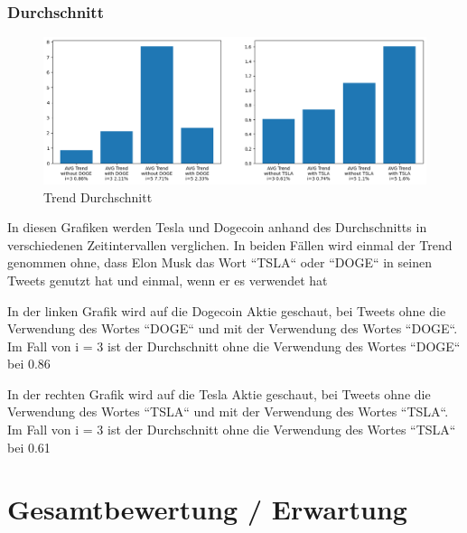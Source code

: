 \documentclass{article}
\begin{document}
\subsubsection{Durchschnitt}
\begin{figure}[!htb]
  	\includegraphics[width=\textwidth, center]{../imgs/Trend_Durchschnitt.png}
 	\caption{Trend Durchschnitt}
 	\label{fig:Trend Durchschnitt}
\end{figure}
In diesen Grafiken werden Tesla und Dogecoin anhand des Durchschnitts in verschiedenen Zeitintervallen verglichen. In beiden Fällen wird einmal der Trend genommen ohne, dass Elon Musk das Wort “TSLA“ oder “DOGE“ in seinen Tweets genutzt hat und einmal, wenn er es verwendet hat

In der linken Grafik wird auf die Dogecoin Aktie geschaut, bei Tweets ohne die Verwendung des Wortes “DOGE“ und mit der Verwendung des Wortes “DOGE“. Im Fall von i = 3 ist der Durchschnitt ohne die Verwendung des Wortes “DOGE“ bei 0.86 %

In der rechten Grafik wird auf die Tesla Aktie geschaut, bei Tweets ohne die Verwendung des Wortes “TSLA“ und mit der Verwendung des Wortes “TSLA“. Im Fall von i = 3 ist der Durchschnitt ohne die Verwendung des Wortes “TSLA“ bei 0.61 %


\section{Gesamtbewertung / Erwartung}
\end{document}

